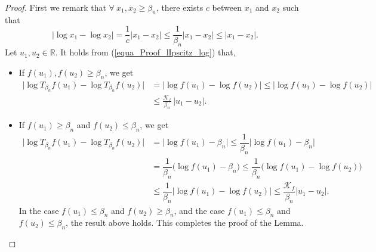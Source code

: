 \documentclass[10pt,twoside]{article}
\numberwithin{equation}{section}
\newcommand{\R}{\ensuremath{\mathbb{R}}}
\begin{document}
\begin{proof}
%
%
 First we remark that $\forall~ x_1, x_2 \ge \beta_n$, there exists $c$ between $x_1$ and $x_2$ such that
%
\begin{equation}\label{equa_Proof_lIpscitz_log}
    |\log x_1 - \log x_2| = \dfrac{1}{c}|x_1 - x_2| \leq \dfrac{1}{\beta_n}|x_1 - x_2| \leq |x_1 - x_2|.
\end{equation}
%
Let $u_1, u_2 \in \R$.
It holds from (\ref{equa_Proof_lIpscitz_log}) that,
%
\begin{itemize}
    \item[$\bullet$] If $f(u_1), f(u_2) \ge \beta_n$, we get
    \begin{align*}
         \big|\log T_{\beta_n} f(u_1) - \log T_{\beta_n} f(u_2)\big|  & = \big|\log f(u_1) - \log f(u_2)\big|   \leq \big|\log f(u_1) - \log f(u_2)\big|
    \\
    & \leq \frac{\mathcal{K}_f}{\beta_n}\, |u_1 - u_2|.
    \end{align*}
    \item[$\bullet$] If $f(u_1) \ge \beta_n$ and $f(u_2) \leq \beta_n$, we get
    \begin{align*}
         \big|\log T_{\beta_n} f(u_1) - \log T_{\beta_n} f(u_2)\big|  & = \big|\log f(u_1) - \beta_n\big|   \leq \dfrac{1}{\beta_n}\big|\log f(u_1) - \beta_n\big|
    \\
    & = \dfrac{1}{\beta_n}\big(\log f(u_1) - \beta_n\big) \leq \dfrac{1}{\beta_n}\big(\log f(u_1) - \log f(u_2)\big)
     \\
    &\leq \dfrac{1}{\beta_n}\big|\log f(u_1) - \log f(u_2)\big| \leq \dfrac{\mathcal{K}_f}{\beta_n}\big|u_1 - u_2\big|.
    \end{align*}
    In the case $f(u_1) \leq \beta_n$ and $f(u_2) \ge \beta_n$, and the case $f(u_1) \leq \beta_n$ and $f(u_2) \leq \beta_n$, the result above holds. This completes the proof of the Lemma. 
\end{itemize}

\end{proof}


%
\end{document}

